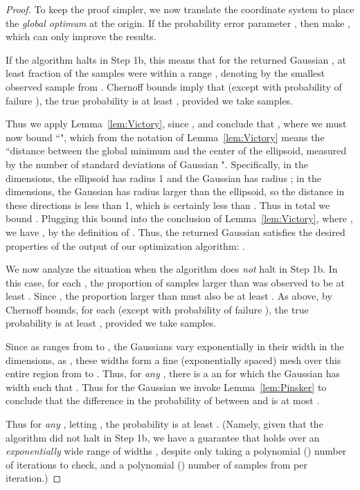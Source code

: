 \documentclass[11pt,letter]{article}
\numberwithin{nTheorems}{section}
\begin{document}
\begin{proof}
To keep the proof simpler, we now translate the coordinate system to place the \emph{global optimum} at the origin. If the probability error parameter , then make , which can only improve the results.



If the algorithm halts in Step 1b, this means that for the returned Gaussian ,  at least  fraction of the samples were within a range , denoting by  the smallest observed sample from . Chernoff bounds imply that (except with probability of failure ), the true probability  is at least , provided we take  samples.

Thus we apply Lemma~\ref{lem:Victory}, since , and conclude that , where we must now bound ``", which from the notation of Lemma~\ref{lem:Victory} means the ``distance between the global minimum and the center of the ellipsoid, measured by the number of standard deviations of Gaussian ". Specifically, in the  dimensions, the ellipsoid has radius 1 and the Gaussian  has radius ; in the  dimensions, the Gaussian has radius larger than the ellipsoid, so the distance in these directions is less than 1, which is certainly less than . Thus in total we bound . Plugging this bound into the conclusion of Lemma~\ref{lem:Victory}, where , we have , by the definition of . Thus, the returned Gaussian satisfies the desired properties of the output of our optimization algorithm: .

We now analyze the situation when the algorithm does \emph{not} halt in Step 1b. In this case, for each , the proportion of samples larger than  was observed to be at least . Since , the proportion larger than  must also be at least . As above, by Chernoff bounds, for each  (except with probability of failure ), the true probability  is at least , provided we take  samples.

Since as  ranges from  to , the Gaussians  vary exponentially in their width in the  dimensions, as , these widths form a fine (exponentially spaced) mesh over this entire region from  to . Thus, for \emph{any} , there is a an  for which the Gaussian  has width  such that . Thus for the Gaussian  we invoke Lemma~\ref{lem:Pinsker} to conclude that the difference in the probability of  between  and  is at most .

Thus for \emph{any} , letting , the probability  is at least . (Namely, given that the algorithm did not halt in Step 1b, we have a guarantee that holds over an \emph{exponentially} wide range of widths , despite only taking a polynomial () number of iterations to check, and a polynomial () number of samples from  per iteration.)



\end{proof}
\end{document}
